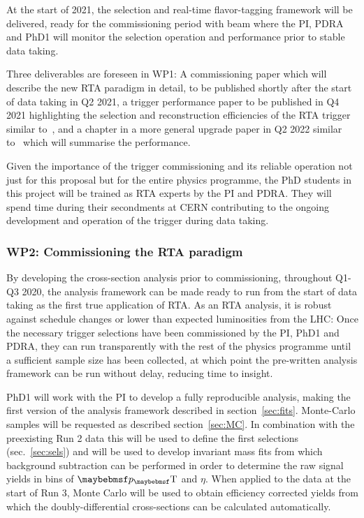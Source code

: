 \documentclass[11pt,a4paper]{article}
\begin{document}
At the start of 2021, the selection and real-time flavor-tagging framework will be delivered, ready for  the commissioning period with beam where the PI, PDRA and PhD1 will monitor the selection operation and  performance prior to stable data taking. 

Three deliverables are foreseen in WP1: A commissioning paper which will describe the new RTA paradigm in detail, to be published shortly after the start of data taking in Q2 2021,
a trigger performance paper to be published in Q4 2021 
highlighting the selection and reconstruction efficiencies of the RTA trigger similar to~\cite{Aaij:2012me}, and a chapter in a more general \LHCb upgrade paper in Q2 2022 similar to~\cite{Aaij:2014jba} which will summarise the performance. 

Given the importance of the trigger commissioning and its reliable operation not just for this proposal but for the entire \LHCb physics programme, the PhD students in this project will be trained as RTA experts by the PI and PDRA. They will spend time during their secondments at CERN contributing to the ongoing development and operation of the trigger during data taking.  

\subsubsection{WP2: Commissioning the RTA paradigm}

By developing the cross-section analysis prior to commissioning, throughout Q1-Q3 2020, the analysis framework can be made ready to run from the start of data taking as the first true application of RTA. As an RTA analysis, it is robust against schedule changes or lower than expected luminosities from the LHC: Once the necessary trigger selections have been commissioned by the PI, PhD1 and PDRA, they can run transparently with the rest of the \LHCb physics programme until a sufficient sample size has been collected, at which point the pre-written analysis framework can be run without delay, reducing time to insight.

PhD1 will work with the PI to develop a fully reproducible analysis, making the first version of the  analysis framework described in section~\ref{sec:fits}. Monte-Carlo samples will be requested as described section~\ref{sec:MC}. In combination with the preexisting Run 2 data this will be used to define the first selections (sec.~\ref{sec:sels}) and will be used to develop invariant mass fits from which background subtraction can be performed in order to determine the raw signal yields in bins of $\pT$ and $\eta$. When applied to the data at the start of Run 3, Monte Carlo will be used to obtain efficiency corrected yields from which the doubly-differential cross-sections can be calculated automatically.
\end{document}
